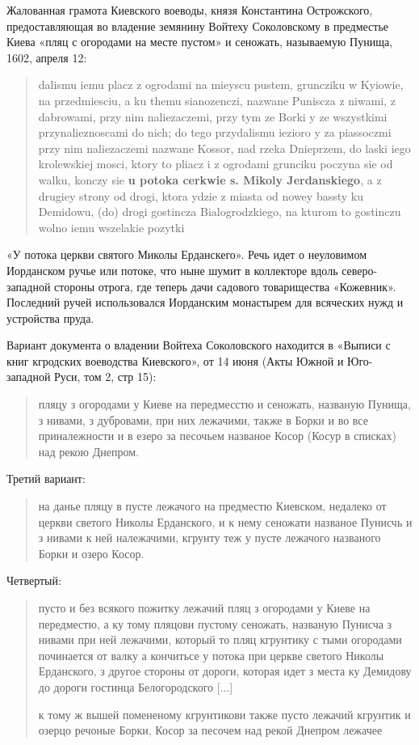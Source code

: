 Жалованная грамота Киевского воеводы, князя Константина Острожского, предоставляющая во владение земянину Войтеху Соколовскому в предместье Киева «пляц с огородами на месте пустом» и сеножать, называемую Пунища, 1602, апреля 12:
\begin{otherlanguage}{polish}
\begin{quotation}
dalismu iemu placz z ogrodami na mieyscu pustem, gruncziku w Kyiowie, na przedmiesciu, a ku themu sianozenczi, nazwane Puniscza z niwami, z dabrowami, przy nim naliezaczemi, przy tym ze Borki y ze wszystkimi przynalieznoscami do nich; do tego przydalismu iezioro y za piassoczmi przy nim naliezaczemi nazwane Kossor, nad rzeka Dnieprzem, do laski iego krolewskiej mosci, ktory to pliacz i z ogrodami grunciku poczyna sie od walku, konczy sie \textbf{u potoka cerkwie s. Mikoly Jerdan\-skiego}, a z drugiey strony od drogi, ktora ydzie z miasta od nowey bassty ku Demidowu, (do) drogi gostincza Bialogrodzkiego, na kturom to gostinczu wolno iemu wszelakie pozytki
\end{quotation}
\end{otherlanguage}
«У потока церкви святого Миколы Ерданскего». Речь идет о неуловимом Иорданском ручье или потоке, что ныне шумит в коллекторе вдоль северо-западной стороны отрога, где теперь дачи садового товарищества «Кожевник». Последний ручей использовался Иорданским монастырем для всяческих нужд и устройства пруда.

Вариант документа о владении Войтеха Соколовского находится в «Выписи с книг кгродских воеводства Киевского», от 14 июня (Акты Южной и Юго-западной Руси, том 2, стр 15):

\begin{quotation}
пляцу з огородами у Киеве на передмесстю и сеножать, названую Пунища, з нивами, з дубровами, при них лежачими, также в Борки и во все приналежности и в езеро за песочьем названое Косор (Косур в списках) над рекою Днепром.
\end{quotation}

Третий вариант:

\begin{quotation}
на данье пляцу в пусте лежачого на предместю Киевском, недалеко от церкви светого Николы Ерданского, и к нему сеножати названое Пунисчь и з нивами к ней належачими, кгрунту теж у пусте лежачого названого Борки и озеро Косор.
\end{quotation}

Четвертый:

\begin{quotation}
пусто и без всякого пожитку лежачий пляц з огородами у Киеве на передместю, а ку тому пляцови пустому сеножать, названую Пунисча з нивами при ней лежачими, который то пляц кгрунтику с тыми огородами починается от валку а кончитьсе у потока при церкве светого Николы Ерданского, з другое стороны от дороги, которая идет з места ку Демидову до дороги гостинца Белогородского [...]

к тому ж вышей помененому кгрунтикови также пусто лежачий кгрунтик и озерцо речоные Борки, Косор за песочем над рекой Днепром лежачее
\end{quotation}

